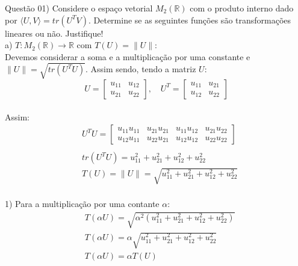 
\noindent \textcolor{COLOR1}{Questão 01)} Considere o espaço vetorial $M_2(\mathbb{R}) $ com o produto interno dado por $\langle U, V\rangle = tr(U^T V )$. Determine se as seguintes funções são transformações lineares ou não. Justifique!
\\

a) $T: M_2(\mathbb{R})\to \mathbb{R}$ com $T(U)=\|U\|$:\\

Devemos considerar a soma e a multiplicação por uma constante e $\|U\|=\sqrt{tr(U^TU)}$. Assim sendo, tendo a matriz $U$:\\

\[
    U=\begin{bmatrix}
        u_{11} & u_{12} \\
        u_{21} & u_{22}
    \end{bmatrix}, \quad
    U^T=\begin{bmatrix}
        u_{11} & u_{21} \\
        u_{12} & u_{22}
    \end{bmatrix}
\]
\\

Assim:\\

\[
    \begin{split}
        &U^TU=\begin{bmatrix}
            u_{11}u_{11} & u_{21}u_{21} & u_{11}u_{12} & u_{21}u_{22} \\
            u_{12}u_{11} & u_{22}u_{21} & u_{12}u_{12} & u_{22}u_{22}
        \end{bmatrix}\\ \\
        &tr(U^TU)=u_{11}^2 + u_{21}^2 + u_{12}^2 + u_{22}^2\\
        &T(U)=\|U\| = \sqrt{u_{11}^2 + u_{21}^2 + u_{12}^2 + u_{22}^2}
    \end{split}
\]\\

1) Para a multiplicação por uma contante $\alpha$:
\\

\[
    \begin{split}
        &T(\alpha U) = \sqrt{\alpha^2(u_{11}^2 + u_{21}^2 + u_{12}^2 + u_{22}^2)}\\
        &T(\alpha U) = \alpha\sqrt{u_{11}^2 + u_{21}^2 + u_{12}^2 + u_{22}^2}\\
        &T(\alpha U) = \alpha T(U)
    \end{split}
\]\\

